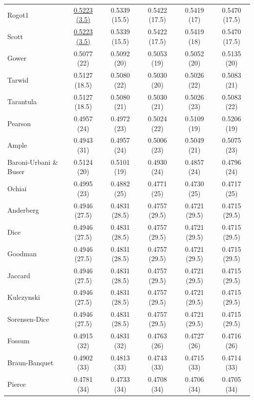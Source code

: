 \begin{table}[t]
{\begin{tabular}{lccccc}
Rogot1 & \underline{0.5223 (3.5)} & 0.5339 (15.5) & 0.5422 (17.5) & 0.5419 (17) & 0.5470 (17.5) \\
Scott & \underline{0.5223 (3.5)} & 0.5339 (15.5) & 0.5422 (17.5) & 0.5419 (18) & 0.5470 (17.5) \\
Gower & 0.5077 (22) & 0.5092 (20) & 0.5053 (19) & 0.5052 (20) & 0.5135 (20) \\
Tarwid & 0.5127 (18.5) & 0.5080 (22) & 0.5030 (20) & 0.5026 (22) & 0.5083 (21) \\
Tarantula & 0.5127 (18.5) & 0.5080 (21) & 0.5030 (21) & 0.5026 (23) & 0.5083 (22) \\
Pearson & 0.4957 (24) & 0.4972 (23) & 0.5024 (22) & 0.5109 (19) & 0.5206 (19) \\
Ample & 0.4943 (31) & 0.4957 (24) & 0.5006 (23) & 0.5049 (21) & 0.5075 (23) \\
Baroni-Urbani \& Buser & 0.5124 (20) & 0.5101 (19) & 0.4930 (24) & 0.4857 (24) & 0.4796 (24) \\
Ochiai & 0.4995 (23) & 0.4882 (25) & 0.4771 (25) & 0.4730 (25) & 0.4717 (25) \\
Anderberg & 0.4946 (27.5) & 0.4831 (28.5) & 0.4757 (29.5) & 0.4721 (29.5) & 0.4715 (29.5) \\
Dice & 0.4946 (27.5) & 0.4831 (28.5) & 0.4757 (29.5) & 0.4721 (29.5) & 0.4715 (29.5) \\
Goodman & 0.4946 (27.5) & 0.4831 (28.5) & 0.4757 (29.5) & 0.4721 (29.5) & 0.4715 (29.5) \\
Jaccard & 0.4946 (27.5) & 0.4831 (28.5) & 0.4757 (29.5) & 0.4721 (29.5) & 0.4715 (29.5) \\
Kulczynski & 0.4946 (27.5) & 0.4831 (28.5) & 0.4757 (29.5) & 0.4721 (29.5) & 0.4715 (29.5) \\
Sorensen-Dice & 0.4946 (27.5) & 0.4831 (28.5) & 0.4757 (29.5) & 0.4721 (29.5) & 0.4715 (29.5) \\
Fossum & 0.4915 (32) & 0.4831 (32) & 0.4763 (26) & 0.4727 (26) & 0.4716 (26) \\
Braun-Banquet & 0.4902 (33) & 0.4813 (33) & 0.4743 (33) & 0.4715 (33) & 0.4714 (33) \\
Pierce & 0.4781 (34) & 0.4733 (34) & 0.4708 (34) & 0.4706 (34) & 0.4705 (34) \\
\bottomrule
\end{tabular}
}
\end{table}
